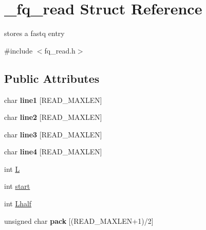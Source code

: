 \hypertarget{struct__fq__read}{\section{\+\_\+fq\+\_\+read Struct Reference}
\label{struct__fq__read}
}


stores a fastq entry  




{\ttfamily \#include $<$fq\+\_\+read.\+h$>$}

\subsection*{Public Attributes}
\begin{DoxyCompactItemize}
\item 
\hypertarget{struct__fq__read_a7a643c49516b3a35f221d0fcda7f9ff3}{char {\bfseries line1} \mbox{[}R\+E\+A\+D\+\_\+\+M\+A\+X\+L\+E\+N\mbox{]}}\label{struct__fq__read_a7a643c49516b3a35f221d0fcda7f9ff3}

\item 
\hypertarget{struct__fq__read_af2502a6f97e9508936c1b9f08890cc84}{char {\bfseries line2} \mbox{[}R\+E\+A\+D\+\_\+\+M\+A\+X\+L\+E\+N\mbox{]}}\label{struct__fq__read_af2502a6f97e9508936c1b9f08890cc84}

\item 
\hypertarget{struct__fq__read_a3df48e8dc31e47dc36c371002dba1bb5}{char {\bfseries line3} \mbox{[}R\+E\+A\+D\+\_\+\+M\+A\+X\+L\+E\+N\mbox{]}}\label{struct__fq__read_a3df48e8dc31e47dc36c371002dba1bb5}

\item 
\hypertarget{struct__fq__read_a8074fd734cb7e3d4b87454417aea569a}{char {\bfseries line4} \mbox{[}R\+E\+A\+D\+\_\+\+M\+A\+X\+L\+E\+N\mbox{]}}\label{struct__fq__read_a8074fd734cb7e3d4b87454417aea569a}

\item 
int \hyperlink{struct__fq__read_a746efa9093b5223e85ffb7274e7693ef}{L}
\item 
int \hyperlink{struct__fq__read_a0b8deb6c25c72026b4928b17e3f12ade}{start}
\item 
int \hyperlink{struct__fq__read_a9cf08b81f1e78553e08fb597d30192b6}{Lhalf}
\item 
\hypertarget{struct__fq__read_afd023930012710b1a015ef78a02b3721}{unsigned char {\bfseries pack} \mbox{[}(R\+E\+A\+D\+\_\+\+M\+A\+X\+L\+E\+N+1)/2\mbox{]}}\label{struct__fq__read_afd023930012710b1a015ef78a02b3721}

\end{DoxyCompactItemize}


